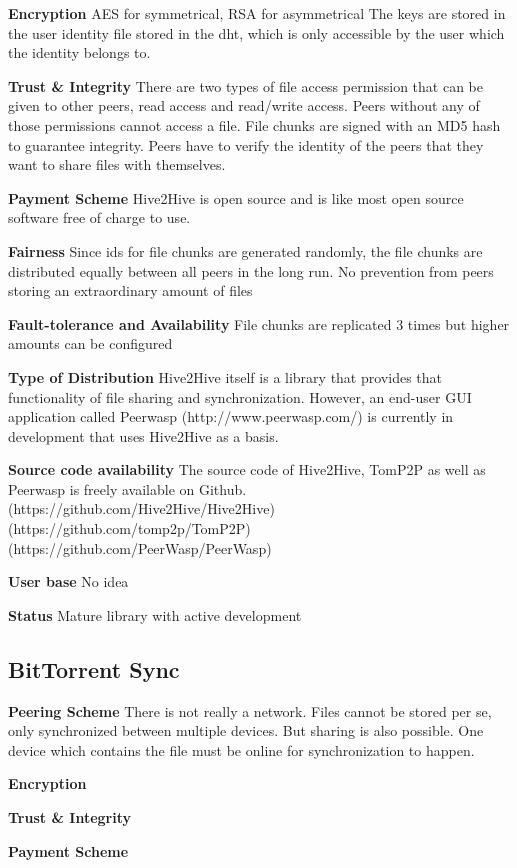 \textbf{Encryption}
AES for symmetrical, RSA for asymmetrical
The keys are stored in the user identity file stored in the dht, which is only accessible by the user which the identity belongs to.

\textbf{Trust \& Integrity}
There are two types of file access permission that can be given to other peers, read access and read/write access. Peers without any of those permissions cannot access a file. File chunks are signed with an MD5 hash to guarantee integrity. Peers have to verify the identity of the peers that they want to share files with themselves.

\textbf{Payment Scheme}
Hive2Hive is open source and is like most open source software free of charge to use.

\textbf{Fairness}
Since ids for file chunks are generated randomly, the file chunks are distributed equally between all peers in the long run. No prevention from peers storing an extraordinary amount of files

\textbf{Fault-tolerance and Availability}
File chunks are replicated 3 times but higher amounts can be configured

\textbf{Type of Distribution}
Hive2Hive itself is a library that provides that functionality of file sharing and synchronization. However, an end-user GUI application called Peerwasp (http://www.peerwasp.com/) is currently in development that uses Hive2Hive as a basis.

\textbf{Source code availability}
The source code of Hive2Hive, TomP2P as well as Peerwasp is freely available on Github. (https://github.com/Hive2Hive/Hive2Hive) (https://github.com/tomp2p/TomP2P) (https://github.com/PeerWasp/PeerWasp)

\textbf{User base}
No idea

\textbf{Status}
Mature library with active development

\subsection{BitTorrent Sync} %

\textbf{Peering Scheme}
There is not really a network. Files cannot be stored per se, only synchronized between multiple devices. But sharing is also possible. One device which contains the file must be online for synchronization to happen.

\textbf{Encryption}

\textbf{Trust \& Integrity}

\textbf{Payment Scheme}

